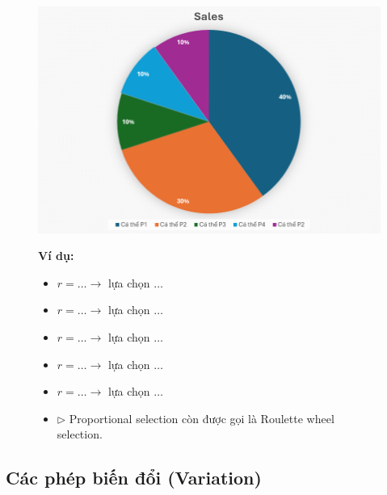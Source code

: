 \documentclass{book}
\begin{document}
\begin{figure}[H]
    \centering
    \begin{minipage}[c]{0.45\textwidth} %
        \centering
        \includegraphics[width=\linewidth]{images/pie_chart.png} %
    \end{minipage}
    \begin{minipage}[c]{0.45\textwidth}
        \textbf{Ví dụ:}
        \begin{itemize}
            \item $r = \dots \rightarrow$ lựa chọn $\dots$
            \item $r = \dots \rightarrow$ lựa chọn $\dots$
            \item $r = \dots \rightarrow$ lựa chọn $\dots$
            \item $r = \dots \rightarrow$ lựa chọn $\dots$
            \item $r = \dots \rightarrow$ lựa chọn $\dots$
        \end{itemize}
        \begin{itemize}
            \item[] $\triangleright$ Proportional selection còn được gọi là Roulette wheel selection.
        \end{itemize}
    \end{minipage}
\end{figure}

\subsection{Các phép biến đổi (Variation)}
\end{document}
